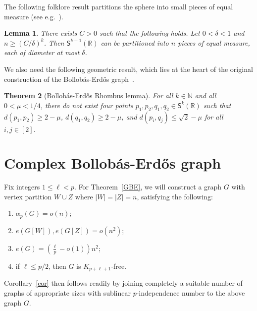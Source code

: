 \documentclass[11pt, a4paper]{article}
\newcounter{propcounter}
\newtheorem{theorem}{Theorem}[section]
\newtheorem{lemma}[theorem]{Lemma}
\theoremstyle{definition}
\def\al{{\alpha}}
\newcommand{\sS}{\mathsf{S}}
\newcommand{\sR}{\mathbb{R}}
\begin{document}
The following folklore result partitions the sphere into small pieces of equal measure (see e.g.~\cite{FS}).
\begin{lemma}\label{lem: partition-sphere}
	There exists $C>0$ such that the following holds. Let $0<\delta<1$ and $n\ge (C/\delta)^k$. Then $\sS^{k-1}(\sR)$ can be partitioned into $n$ pieces of equal measure, each of diameter at most $\delta$.
\end{lemma}

We also need the following geometric result, which lies at the heart of the original construction of the Bollob\'as-Erd\H os graph~\cite{BolErd76}.
\begin{theorem}[Bollob\'as-Erd\H os Rhombus lemma]\label{thm-k4}
	For all $k \in \mathbb{N}$ and all $0<\mu<1/4$, there do not exist four points $p_1,p_2,q_1,q_2\in\sS^k(\sR)$ such that $d(p_1,p_2)\ge 2-\mu$, $d(q_1,q_2)\ge 2-\mu$, and $d(p_i,q_j)\le\sqrt{2}-\mu$ for all $i,j\in [2]$.
\end{theorem}





\section{Complex Bollob\'as-Erd\H os graph}\label{sec-GBE}
Fix integers $1\le \ell <p$. For Theorem~\ref{GBE}, we will construct a graph $G$ with vertex partition $W \cup Z$ where $|W|=|Z|=n$, satisfying the following:
\begin{enumerate}[label = {\bfseries \Alph{propcounter}\arabic{enumi}}]
	\item\label{CBE:p-ind} $\al_{p}(G)= o(n)$;
	\item\label{CBE:sparse-inside} $e(G[W]),e(G[Z]) = o(n^2)$;
    \item\label{CBE:density} $e(G)= \left(\frac{\ell}{p}-o(1)\right)n^2$;
    \item\label{CBE:clique} if $\ell\le p/2$, then $G$ is $K_{p+\ell+1}$-free.
\end{enumerate}
Corollary~\ref{cor} then follows readily by joining completely a suitable number of graphs of appropriate sizes with sublinear $p$-independence number to the above graph $G$.
\end{document}
